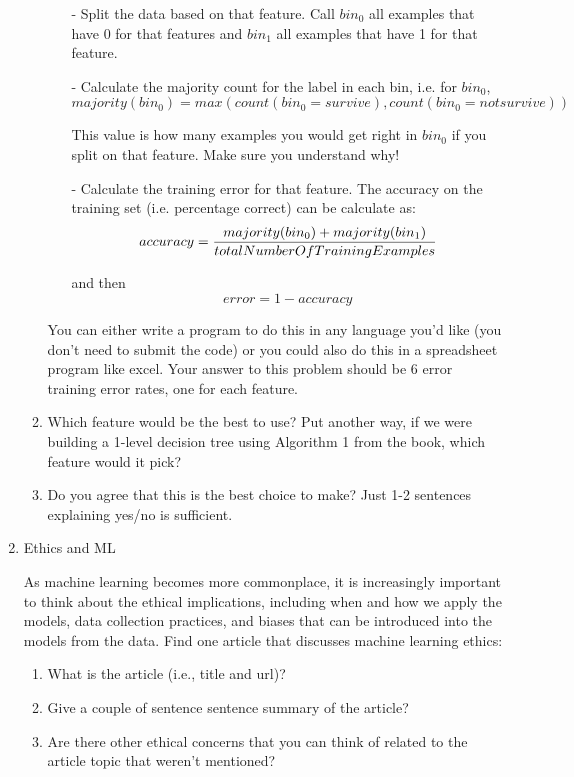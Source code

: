 \documentclass[11pt]{article}
\begin{document}
\begin{enumerate}
\begin{enumerate}
\begin{itemize}

\item[-] Split the data based on that feature.  Call $bin_0$ all examples that have 0 for that features and $bin_1$ all examples that have 1 for that feature.

\item[-] Calculate the majority count for the label in each bin, i.e. for $bin_0$, 
\[
majority(bin_0) = max(count(bin_0=survive), count(bin_0=notsurvive))
\]

This value is how many examples you would get right in $bin_0$ if you split on that feature.  Make sure you understand why!

\item[-] Calculate the training error for that feature. The accuracy on the training set (i.e. percentage correct) can be calculate as:
\[
accuracy = \frac{majority(bin_0)+majority(bin_1)}{totalNumberOfTrainingExamples}\\
\]

and then\[
error = 1 - accuracy
\]

\end{itemize}

You can either write a program to do this in any language you'd like (you don't need to submit the code) or you could also do this in a spreadsheet program like excel.  Your answer to this problem should be 6 error training error rates, one for each feature.

\item Which feature would be the best to use?  Put another way, if we were building a 1-level decision tree using Algorithm 1 from the book, which feature would it pick?

\item Do you agree that this is the best choice to make?  Just 1-2 sentences explaining yes/no is sufficient.

\end{enumerate}

\item Ethics and ML

As machine learning becomes more commonplace, it is increasingly important to think about the ethical implications, including when and how we apply the models, data collection practices, and biases that can be introduced into the models from the data.  Find one article that discusses machine learning ethics:

\begin{enumerate}

\item What is the article (i.e., title and url)?

\item Give a couple of sentence sentence summary of the article?

\item Are there other ethical concerns that you can think of related to the article topic that weren't mentioned?

\end{enumerate}

\end{enumerate}
\end{document}
